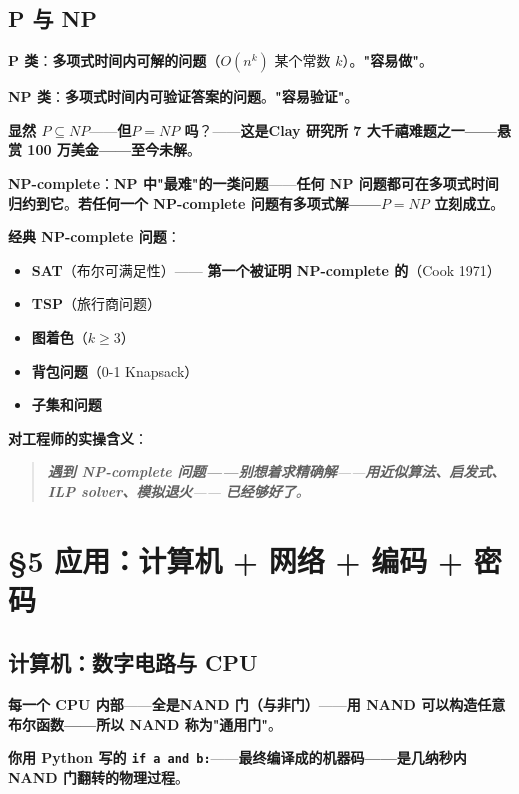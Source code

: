 \subsection{P 与 NP}

\textbf{P 类}：\textbf{多项式时间内可解的问题}（$O(n^k)$ 某个常数 $k$）。\textbf{"容易做"}。

\textbf{NP 类}：\textbf{多项式时间内可\textbf{验证答案}的问题}。\textbf{"容易验证"}。

\textbf{显然 $P \subseteq NP$}——\textbf{但\textbf{$P = NP$ 吗}}？——\textbf{这是\textbf{Clay 研究所 7 大千禧难题之一}——\textbf{悬赏 100 万美金}——\textbf{至今未解}}。

\textbf{NP-complete}：\textbf{NP 中"最难"的一类问题}——\textbf{任何 NP 问题都可在多项式时间归约到它}。\textbf{若任何一个 NP-complete 问题有多项式解——\textbf{$P = NP$ 立刻成立}}。

\textbf{经典 NP-complete 问题}：

\begin{itemize}
\item \textbf{SAT}（布尔可满足性）—— \textbf{第一个被证明 NP-complete 的}（Cook 1971）
\item \textbf{TSP}（旅行商问题）
\item \textbf{图着色}（$k \ge 3$）
\item \textbf{背包问题}（0-1 Knapsack）
\item \textbf{子集和问题}
\end{itemize}

\textbf{对工程师的实操含义}：

\begin{quote}\itshape
\textbf{遇到 NP-complete 问题——\textbf{别想着求精确解}}——\textbf{用\textbf{近似算法、启发式、ILP solver、模拟退火}}—— \textbf{已经够好了}。
\end{quote}

\section{§5 应用：计算机 + 网络 + 编码 + 密码}

\subsection{计算机：数字电路与 CPU}

\textbf{每一个 CPU 内部}——\textbf{全是\textbf{NAND 门}（与非门）}——\textbf{用 NAND 可以构造\textbf{任意布尔函数}——\textbf{所以 NAND 称为"通用门"}}。

\textbf{你用 Python 写的 \texttt{if a and b:}}——\textbf{最终编译成的机器码——\textbf{是几纳秒内 NAND 门翻转的物理过程}}。


